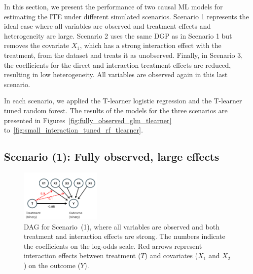 In this section, we present the performance of two causal ML models for estimating the ITE under different simulated scenarios. Scenario 1 represents the ideal case where all variables are observed and treatment effects and heterogeneity are large. Scenario 2 uses the same DGP as in Scenario 1 but removes the covariate $X_1$, which has a strong interaction effect with the treatment, from the dataset and treats it as unobserved. Finally, in Scenario 3, the coefficients for the direct and interaction treatment effects are reduced, resulting in low heterogeneity. All variables are observed again in this last scenario. 

In each scenario, we applied the T-learner logistic regression and the T-learner tuned random forest. The results of the models for the three scenarios are presented in Figures~\ref{fig:fully_observed_glm_tlearner} to~\ref{fig:small_interaction_tuned_rf_tlearner}.


\subsection{Scenario (1): Fully observed, large effects}



\begin{figure}[htbp]
\centering
\includegraphics[width=0.35\textwidth]{img/results_ITE_simulation/simulation_observed.png}
\caption{DAG for Scenario~(1), where all variables are observed and both treatment and interaction effects are strong. The numbers indicate the coefficients on the log-odds scale. Red arrows represent interaction effects between treatment ($T$) and covariates ($X_1$ and $X_2$) on the outcome ($Y$).}
\label{fig:fully_observed_dag}
\end{figure}


